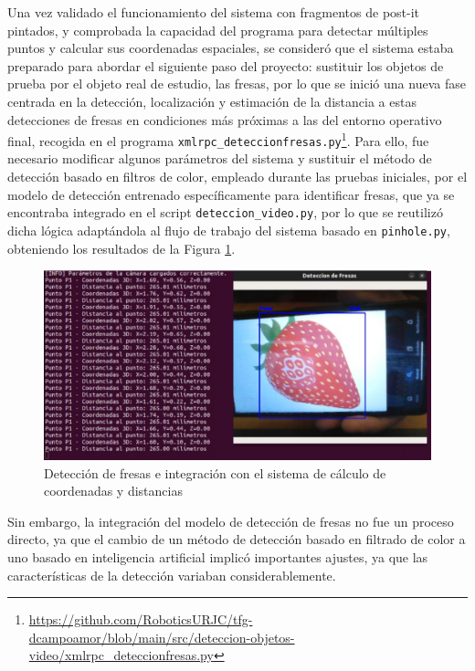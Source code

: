 Una vez validado el funcionamiento del sistema con fragmentos de post-it pintados, y comprobada la capacidad del programa para detectar múltiples puntos y calcular sus coordenadas espaciales, se consideró que el sistema estaba preparado para abordar el siguiente paso del proyecto: sustituir los objetos de prueba por el objeto real de estudio, las fresas, por lo que se inició una nueva fase centrada en la detección, localización y estimación de la distancia a estas detecciones de fresas en condiciones más próximas a las del entorno operativo final, recogida en el programa \verb|xmlrpc_deteccionfresas.py|\footnote{\url{https://github.com/RoboticsURJC/tfg-dcampoamor/blob/main/src/deteccion-objetos-video/xmlrpc_deteccionfresas.py}}. Para ello, fue necesario modificar algunos parámetros del sistema y sustituir el método de detección basado en filtros de color, empleado durante las pruebas iniciales, por el modelo de detección entrenado específicamente para identificar fresas, que ya se encontraba integrado en el script \verb|deteccion_video.py|, por lo que se reutilizó dicha lógica adaptándola al flujo de trabajo del sistema basado en \verb|pinhole.py|, obteniendo los resultados de la Figura \ref{fig:union_scripts_fresas}.

  \begin{figure}[H]
    \centering
    \begin{center}
      \includegraphics[width=155mm]{figs/Pruebas deteccion fresas y obtencion coordenadas varios codigos.png}
    \end{center}
    \caption{Detección de fresas e integración con el sistema de cálculo de coordenadas y distancias}
    \label{fig:union_scripts_fresas}
  \end{figure}

Sin embargo, la integración del modelo de detección de fresas no fue un proceso directo, ya que el cambio de un método de detección basado en filtrado de color a uno basado en inteligencia artificial implicó importantes ajustes, ya que las características de la detección variaban considerablemente. 

